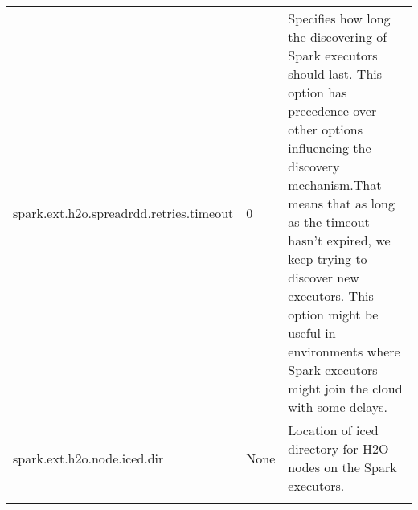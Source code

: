 \documentclass{standalone}
\begin{document}
\begin{footnotesize}
\begin{longtable}[!ht]{l p{2.0cm} p{3.0cm}}
			spark.ext.h2o.spreadrdd.retries.timeout & 0 & Specifies how long the discovering of Spark executors should last. This option has precedence over other options influencing the discovery mechanism.That means that as long as the timeout hasn't expired, we keep trying to discover new executors. This option might be useful in environments where Spark executors might join the cloud with some delays. \\ \addlinespace

			spark.ext.h2o.node.iced.dir & None & Location of iced directory for H2O nodes on the Spark executors. \\ \addlinespace

			\bottomrule
		\end{longtable}
	\end{footnotesize}
\end{document}
